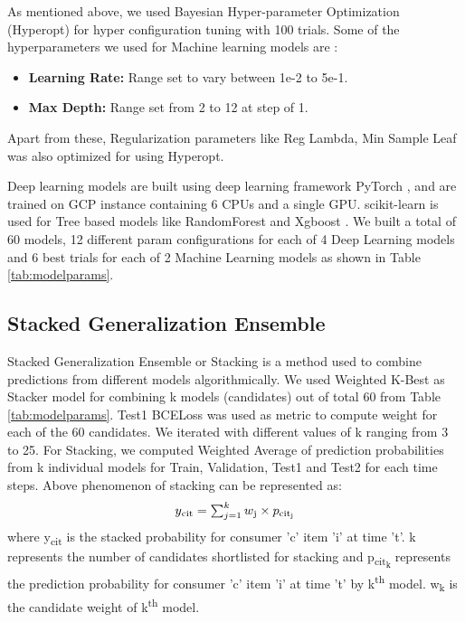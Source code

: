 As mentioned above, we used Bayesian Hyper-parameter Optimization (Hyperopt) \cite{bergstra2013hyperopt} for hyper configuration 
tuning with 100 trials. Some of the hyperparameters we used for Machine learning models are :
  \begin{itemize}
    \item {\bf Learning Rate:} Range set to vary between 1e-2 to 5e-1. 
    \item {\bf Max Depth:} Range set from 2 to 12 at step of 1.
  \end{itemize}
Apart from these, Regularization parameters like Reg Lambda, Min Sample Leaf was also optimized for using Hyperopt.

Deep learning models are built using deep learning framework
PyTorch \cite{paszke2017automatic}, and are trained on GCP instance containing 6 CPUs and a single GPU. 
scikit-learn \cite{pedregosa2011scikit} is used for Tree
based models like RandomForest and Xgboost \cite{chen2016xgboost}. 
We built a total of 60 models, 12 different param configurations for each of 4 
Deep Learning models and 6 best trials for each of 2 Machine Learning models as shown in Table \ref{tab:modelparams}.
\subsection{Stacked Generalization Ensemble}
Stacked Generalization Ensemble or Stacking \cite{wolpert1992stacked} is a method used to combine predictions from 
different models algorithmically.
We used Weighted K-Best as Stacker model for combining k models (candidates) out of total 60 from Table \ref{tab:modelparams}. 
Test1 BCELoss was used as metric to compute weight for each of the 60 candidates. We iterated with different 
values of k ranging from 3 to 25. For Stacking, we computed Weighted Average of prediction
probabilities from k individual models for Train, Validation, Test1 and Test2 for each time steps.
Above phenomenon of stacking can be represented as:
  \begin{equation}
    \begin{array}{l}
      y\textsubscript{cit} =\sum_{j=1}^{k}w\textsubscript{j} \times p\textsubscript{cit\textsubscript{j}}
    \end{array}
    \label{eqn:stack}
  \end{equation}
where y\textsubscript{cit} is the stacked probability for consumer 'c' item ’i’ at time ’t’.
k represents the number of candidates shortlisted for stacking and p\textsubscript{cit\textsubscript{k}}
represents the prediction probability for consumer 'c' item ’i’ at time ’t’ by k\textsuperscript{th} model.
w\textsubscript{k} is the candidate weight of k\textsuperscript{th} model.

